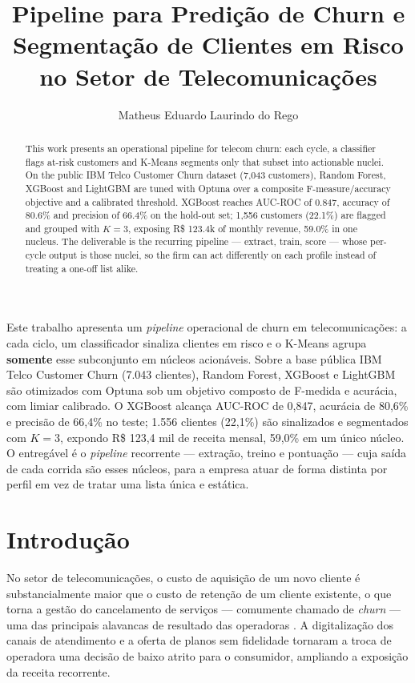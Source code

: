 \documentclass[12pt]{article}
\title{Pipeline para Predição de Churn e Segmentação de Clientes em Risco no Setor de Telecomunicações}
\author{Matheus Eduardo Laurindo do Rego\inst{1}}
\begin{document}
\maketitle

\begin{abstract}
  This work presents an operational pipeline for telecom churn: each cycle,
  a classifier flags at-risk customers and K-Means segments only that subset
  into actionable nuclei. On the public IBM Telco Customer Churn dataset
  (7,043 customers), Random Forest, XGBoost and LightGBM are tuned with Optuna
  over a composite F-measure/accuracy objective and a calibrated threshold.
  XGBoost reaches AUC-ROC of 0.847, accuracy of 80.6\% and precision of 66.4\%
  on the hold-out set; 1,556 customers (22.1\%) are flagged and grouped with
  $K = 3$, exposing R\$ 123.4k of monthly revenue, 59.0\% in one nucleus. The
  deliverable is the recurring pipeline --- extract, train, score --- whose
  per-cycle output is those nuclei, so the firm can act differently on each
  profile instead of treating a one-off list alike.
\end{abstract}

\begin{resumo}
  Este trabalho apresenta um \textit{pipeline} operacional de churn em
  telecomunicações: a cada ciclo, um classificador sinaliza clientes em risco
  e o K-Means agrupa \textbf{somente} esse subconjunto em núcleos acionáveis.
  Sobre a base pública IBM Telco Customer Churn (7.043 clientes), Random
  Forest, XGBoost e LightGBM são otimizados com Optuna sob um objetivo
  composto de F-medida e acurácia, com limiar calibrado. O XGBoost alcança
  AUC-ROC de 0,847, acurácia de 80,6\% e precisão de 66,4\% no teste; 1.556
  clientes (22,1\%) são sinalizados e segmentados com $K = 3$, expondo
  R\$ 123,4 mil de receita mensal, 59,0\% em um único núcleo. O entregável é
  o \textit{pipeline} recorrente --- extração, treino e pontuação --- cuja
  saída de cada corrida são esses núcleos, para a empresa atuar de forma
  distinta por perfil em vez de tratar uma lista única e estática.
\end{resumo}


\section{Introdução}

No setor de telecomunicações, o custo de aquisição de um novo cliente é
substancialmente maior que o custo de retenção de um cliente existente, o que
torna a gestão do cancelamento de serviços --- comumente chamado de
\textit{churn} --- uma das principais alavancas de resultado das operadoras
\cite{hadden2007, verbeke2012}. A digitalização dos canais de atendimento e a
oferta de planos sem fidelidade tornaram a troca de operadora uma decisão de
baixo atrito para o consumidor, ampliando a exposição da receita recorrente.
\end{document}
